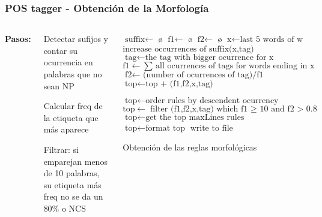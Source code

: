 \documentclass{beamer}
\begin{document}
\begin{frame}[fragile]
\frametitle{POS tagger - Obtención de la Morfología}
\begin{columns}[t] %
\textbf{Pasos:}
\begin{enumerate}
\begin{scriptsize}
\item Detectar sufijos y contar su ocurrencia en palabras que no sean NP
\item Calcular freq de la etiqueta que más aparece
\item Filtrar: si emparejan menos de 10 palabras, su etiqueta más freq no se da un 80\% o NCS
\end{scriptsize}
\end{enumerate}
   \begin{algorithm}[H]
   \begin{scriptsize}\fontsize{8}{8}\selectfont
    \begin{algorithmic}[1]
    \State $\text{suffix} \gets$ \o
    \State $\text{f1} \gets$ \o
    \State $\text{f2} \gets$ \o 
            \State $\text{x} \gets \text{last 5 words of w}$
             \State $\text{increase occurrences of suffix(x,tag)}$ \EndIf
            \EndFor
    \EndFor        
    		\State $\text{tag} \gets \text{the tag with bigger ocurrence for x}$
            \State $\text{f1} \gets \text{$\sum$ all ocurrences of tags for words ending in x}$
            \State $\text{f2} \gets \text{ (number of ocurrences of tag)/f1}$ 
            \State $\text{top} \gets \text{top + (f1,f2,x,tag) }$
    \EndFor
            
     \State $\text{top} \gets \text{order rules by descendent ocurrency}$
     \State $\text{top} \gets \text{filter (f1,f2,x,tag) which f1 $\geq$ 10 and f2 > 0.8 }$
     \State $\text{top} \gets \text{get the top maxLines rules}$
     \State $\text{top} \gets \text{format top}$
     \State $\text{write to file}$     
        \EndProcedure
    \end{algorithmic}
    \label{alg:rAP}
    \caption{Obtención de las reglas morfológicas}
    \end{scriptsize}
\end{algorithm}    
\end{columns}
\end{frame}
\end{document}
